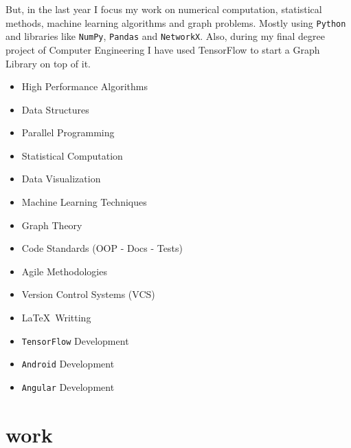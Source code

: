 \documentclass{friggeri-cv}
\begin{document}
    But, in the last year I focus my work on numerical computation, statistical methods, machine learning algorithms and graph problems. Mostly using \texttt{Python} and libraries like \texttt{NumPy}, \texttt{Pandas} and \texttt{NetworkX}. Also, during my final degree project of Computer Engineering I have used TensorFlow to start a Graph Library on top of it.

    \noindent
    \begin{minipage}[t]{0.5\linewidth}
      \begin{itemize}
      	\item{High Performance Algorithms}
  	    \item{Data Structures}
        \item{Parallel Programming}
        \item{Statistical Computation}
        \item{Data Visualization}
        \item{Machine Learning Techniques}
        \item{Graph Theory}
      \end{itemize}
    \end{minipage}%
    \begin{minipage}[t]{0.5\linewidth}
      \begin{itemize}
        \item{Code Standards (OOP - Docs - Tests)}
        \item{Agile Methodologies}
        \item{Version Control Systems (VCS)}
      	\item{\LaTeX \ Writting}
        \item{\texttt{TensorFlow} Development}
        \item{\texttt{Android} Development}
        \item{\texttt{Angular} Development}
      \end{itemize}
    \end{minipage}
    \par\bigskip




  \section{work}
\end{document}

